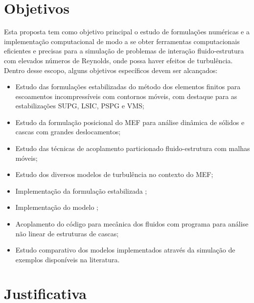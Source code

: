\section{Objetivos}

Esta proposta tem como objetivo principal o estudo de formulações numéricas e a implementação computacional de modo a se obter ferramentas computacionais eficientes e precisas para a simulação de problemas de interação fluido-estrutura com elevados números de Reynolds, onde possa haver efeitos de turbulência. Dentro desse escopo, alguns objetivos específicos devem ser alcançados:

\begin{itemize}
    \item Estudo das formulações estabilizadas do método dos elementos finitos para escoamentos incompressíveis com contornos móveis, com destaque para as estabilizações SUPG, LSIC, PSPG e VMS;

    \item Estudo da formulação posicional do MEF para análise dinâmica de sólidos e cascas com grandes deslocamentos;

    \item Estudo das técnicas de acoplamento particionado fluido-estrutura com malhas móveis;

    \item Estudo dos diversos modelos de turbulência no contexto do MEF;

    \item Implementação da formulação estabilizada \VMS;

    \item Implementação do modelo \LES;

    \item Acoplamento do código para mecânica dos fluidos com programa para análise não linear de estruturas de cascas;

    \item Estudo comparativo dos modelos implementados através da simulação de exemplos disponíveis na literatura.
\end{itemize}

\section{Justificativa}

